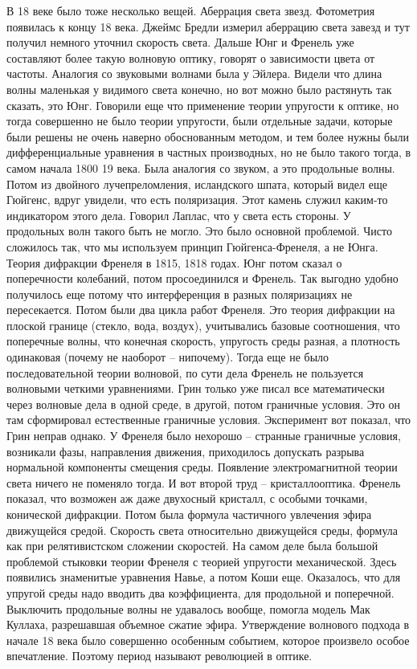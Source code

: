 \documentclass[a4paper, 12pt]{article}
\begin{document}
В 18 веке было тоже несколько вещей. Аберрация света звезд. Фотометрия 
появилась к концу 18 века. Джеймс Бредли измерил аберрацию света завезд 
и тут получил немного уточнил скорость света. Дальше Юнг и Френель уже 
составляют более такую волновую оптику, говорят о зависимости цвета от 
частоты. Аналогия со звуковыми волнами была у Эйлера. Видели что длина 
волны маленькая у видимого света конечно, но вот можно было растянуть 
так сказать, это Юнг. Говорили еще что применение теории упругости 
к оптике, но тогда совершенно не было теории упругости, были отдельные 
задачи, которые были решены не очень наверно обоснованным методом, и тем 
более нужны были дифференциальные уравнения в частных производных, но не 
было такого тогда, в самом начала 1800 19 века. Была аналогия со звуком, 
а это продольные волны. Потом из двойного лучепреломления, исландского 
шпата, который видел еще Гюйгенс, вдруг увидели, что есть поляризация. 
Этот камень служил каким-то индикатором этого дела. Говорил Лаплас, что 
у света есть стороны. У продольных волн такого быть не могло. Это было 
основной проблемой. Чисто сложилось так, что мы используем принцип 
Гюйгенса-Френеля, а не Юнга. Теория дифракции Френеля в 1815, 1818 
годах. Юнг потом сказал о поперечности колебаний, потом просоединился 
и Френель. Так выгодно удобно получилось еще потому что интерференция 
в разных поляризациях не пересекается. Потом были два цикла работ 
Френеля. Это теория дифракции на плоской границе (стекло, вода, воздух), 
учитывались базовые соотношения, что поперечные волны, что конечная 
скорость, упругость среды разная, а плотность одинаковая (почему не 
наоборот -- нипочему). Тогда еще не было последовательной теории 
волновой, по сути дела Френель не пользуется волновыми четкими 
уравнениями. Грин только уже писал все математически через волновые дела 
в одной среде, в другой, потом граничные условия. Это он там сформировал 
естественные граничные условия. Эксперимент вот показал, что Грин неправ 
однако. У Френеля было нехорошо -- странные граничные условия, возникали 
фазы, направления движения, приходилось допускать разрыва нормальной 
компоненты смещения среды. Появление электромагнитной теории света 
ничего не поменяло тогда. И вот второй труд -- кристаллооптика. Френель 
показал, что возможен аж даже двухосный кристалл, с особыми точками, 
конической дифракции. Потом была формула частичного увлечения эфира 
движущейся средой. Скорость света относительно движущейся среды, формула 
как при релятивистском сложении скоростей. На самом деле была большой 
проблемой стыковки теории Френеля с теорией упругости механической. 
Здесь появились знаменитые уравнения Навье, а потом Коши еще. Оказалось, 
что для упругой среды надо вводить два коэффициента, для продольной 
и поперечной. Выключить продольные волны не удавалось вообще, помогла 
модель Мак Куллаха, разрешавшая объемное сжатие эфира. Утверждение 
волнового подхода в начале 18 века было совершенно особенным событием, 
которое произвело особое впечатление. Поэтому период называют революцией 
в оптике.
\end{document}
